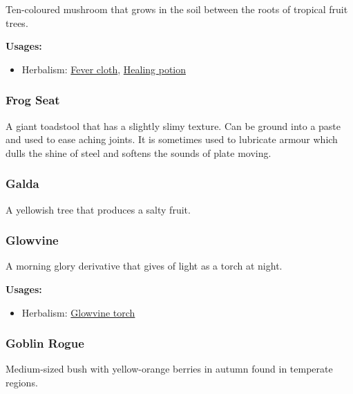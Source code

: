 Ten-coloured mushroom that grows in the soil between the roots of tropical fruit trees.

\vspace{5mm}

\textbf{Usages:}

\begin{itemize}[noitemsep]
\item[] Herbalism: \hyperref[Fever cloth]{Fever cloth}, \hyperref[healing_potion]{Healing potion}
\end{itemize}

\subsubsection{Frog Seat}
\label{frog_seat}

A giant toadstool that has a slightly slimy texture. Can be ground into a paste and used to ease aching joints. It is sometimes used to lubricate armour which dulls the shine of steel and softens the sounds of plate moving.

\subsubsection{Galda}
\label{Galda}

A yellowish tree that produces a salty fruit.

\subsubsection{Glowvine}
\label{Glowvine}

A morning glory derivative that gives of light as a torch at night.

\vspace{5mm}

\textbf{Usages:}

\begin{itemize}[noitemsep]
\item[] Herbalism: \hyperref[Glowvine torch]{Glowvine torch}
\end{itemize}

\subsubsection{Goblin Rogue}
\label{Goblin Rogue}

Medium-sized bush with yellow-orange berries in autumn found in temperate regions.

\vspace{5mm}

